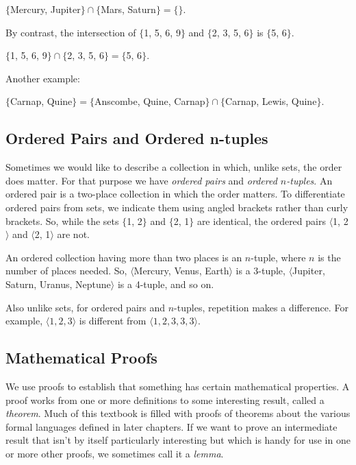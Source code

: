 \begin{center}
	\noindent{}$\{$Mercury, Jupiter$\}\cap\{$Mars, Saturn$\}=\{ \}$.
\end{center}

\noindent{}By contrast, the intersection of $\{$1, 5, 6, 9$\}$ and $\{$2, 3, 5, 6$\}$ is $\{$5, 6$\}$.

\begin{center}
	\noindent{}$\{$1, 5, 6, 9$\}\cap\{$2, 3, 5, 6$\}=\{$5, 6$\}$.
\end{center}

\noindent{}Another example:

\begin{center}
	\noindent{}$\{$Carnap, Quine$\}=\{$Anscombe, Quine, Carnap$\}\cap\{$Carnap, Lewis, Quine$\}$.
\end{center}

\subsection{Ordered Pairs and Ordered n-tuples}\label{orderedpairs}

Sometimes we would like to describe a collection in which, unlike sets, the order does matter.  For that purpose we have \emph{ordered pairs} and \emph{ordered $n$-tuples}.  An ordered pair is a two-place collection in which the order matters.  To differentiate ordered pairs from sets, we indicate them using angled brackets rather than curly brackets.  So, while the sets $\{$1, 2$\}$ and $\{$2, 1$\}$ are identical, the ordered pairs $\langle$1, 2$\rangle$ and $\langle$2, 1$\rangle$ are not.

An ordered collection having more than two places is an $n$-tuple, where $n$ is the number of places needed.  So, $\langle$Mercury, Venus, Earth$\rangle$ is a 3-tuple, $\langle$Jupiter, Saturn, Uranus, Neptune$\rangle$ is a 4-tuple, and so on.

Also unlike sets, for ordered pairs and $n$-tuples, repetition makes a difference. For example, $\langle 1, 2, 3\rangle$ is different from $\langle 1, 2, 3, 3, 3\rangle$.

\subsection{Mathematical Proofs}\label{Mathematical Proofs}

We use proofs to establish that something has certain mathematical properties. 
A proof works from one or more definitions to some interesting result, called a \emph{theorem}. 
Much of this textbook is filled with proofs of theorems about the various formal languages defined in later chapters.
If we want to prove an intermediate result that isn't by itself particularly interesting but which is handy for use in one or more other proofs, we sometimes call it a \emph{lemma}.

